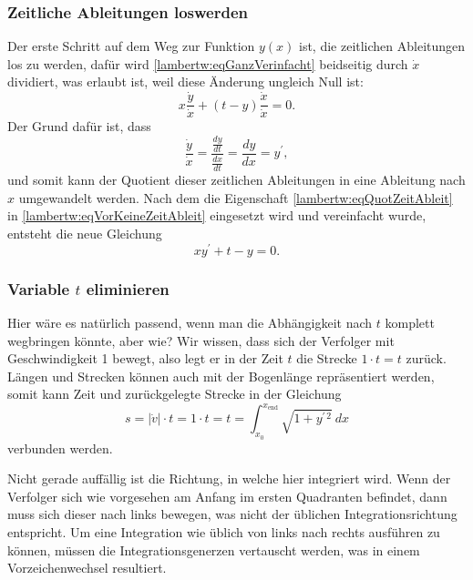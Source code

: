 \subsubsection{Zeitliche Ableitungen loswerden
	\label{lambertw:subsubsection:ZeitAbleit}}
Der erste Schritt auf dem Weg zur Funktion \(y(x)\) ist, die zeitlichen Ableitungen los zu werden, dafür wird \eqref{lambertw:eqGanzVerinfacht} beidseitig durch \(\dot{x}\) dividiert, was erlaubt ist, weil diese Änderung ungleich Null ist:
\begin{equation}
	x \frac{\dot{y}}{\dot{x}} + (t-y) \frac{\dot{x}}{\dot{x}}
	= 0.
	\label{lambertw:eqVorKeineZeitAbleit}
\end{equation}
Der Grund dafür ist, dass
\begin{equation}
	\frac{\displaystyle\dot{y}}{\displaystyle\dot{x}} 
	= \frac{\displaystyle\frac{dy}{dt}}{\displaystyle\frac{dx}{dt}}  
	= \frac{dy}{dx}
	= y^{\prime},
	\label{lambertw:eqQuotZeitAbleit}
\end{equation}
und somit kann der Quotient dieser zeitlichen Ableitungen in eine Ableitung nach \(x\) umgewandelt werden.
Nach dem die Eigenschaft \eqref{lambertw:eqQuotZeitAbleit} in \eqref{lambertw:eqVorKeineZeitAbleit} eingesetzt wird und vereinfacht wurde, entsteht die neue Gleichung
\begin{equation}
	x y^{\prime} + t - y
	= 0.
	\label{lambertw:DGLmitT}
\end{equation}

\subsubsection{Variable \(t\) eliminieren
	\label{lambertw:subsubsection:ZeitAbleit}}
Hier wäre es natürlich passend, wenn man die Abhängigkeit nach \(t\) komplett wegbringen könnte, aber wie?
Wir wissen, dass sich der Verfolger mit Geschwindigkeit 1 bewegt, also legt er in der Zeit \(t\) die Strecke \(1\cdot t = t\) zurück. Längen und Strecken können auch mit der Bogenlänge repräsentiert werden, somit kann Zeit und zurückgelegte Strecke in der Gleichung  
\begin{equation}
	s
	= 
	|\dot{v}| \cdot t
	=
	1 \cdot t
	=
	t
	=
	\int_{\displaystyle x_0}^{\displaystyle x_{\text{end}}}\sqrt{1+y^{\prime\, 2}} \: dx
	\label{lambertw:eqZuBogenlaenge}
\end{equation}
verbunden werden.
  
Nicht gerade auffällig ist die Richtung, in welche hier integriert wird. Wenn der Verfolger sich wie vorgesehen am Anfang im ersten Quadranten befindet, dann muss sich dieser nach links bewegen, was nicht der üblichen Integrationsrichtung entspricht. Um eine Integration wie üblich von links nach rechts ausführen zu können, müssen die Integrationsgenerzen vertauscht werden, was in einem Vorzeichenwechsel resultiert. 

